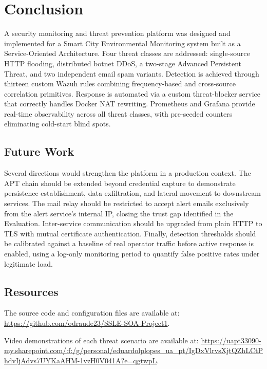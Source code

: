 \section{Conclusion}
\label{sec:conclusion}

A security monitoring and threat prevention platform was designed and implemented
for a Smart City Environmental Monitoring system built as a Service-Oriented
Architecture. Four threat classes are addressed: single-source HTTP flooding,
distributed botnet DDoS, a two-stage Advanced Persistent Threat, and two
independent email spam variants. Detection is achieved through thirteen custom
Wazuh rules combining frequency-based and cross-source correlation primitives.
Response is automated via a custom threat-blocker service that correctly handles
Docker NAT rewriting. Prometheus and Grafana provide real-time observability
across all threat classes, with pre-seeded counters eliminating cold-start blind
spots.

\subsection{Future Work}

Several directions would strengthen the platform in a production context.
The APT chain should be extended beyond credential capture to demonstrate
persistence establishment, data exfiltration, and lateral movement to downstream
services. The mail relay should be restricted to accept alert emails exclusively
from the alert service's internal IP, closing the trust gap identified in the
Evaluation. Inter-service communication should be upgraded from plain HTTP to
TLS with mutual certificate authentication. Finally, detection thresholds should
be calibrated against a baseline of real operator traffic before active response
is enabled, using a log-only monitoring period to quantify false positive rates
under legitimate load.

\subsection*{Resources}

The source code and configuration files are available at:
\url{https://github.com/odraude23/SSLE-SOA-Project1}.

Video demonstrations of each threat scenario are available at:
\url{https://uapt33090-my.sharepoint.com/:f:/g/personal/eduardolplopes_ua_pt/IgDxVlrvsXjtQZhLCtPhdvIjAdvs7UYKaAHM-1vzH0V041A?e=qgtwpL}.
